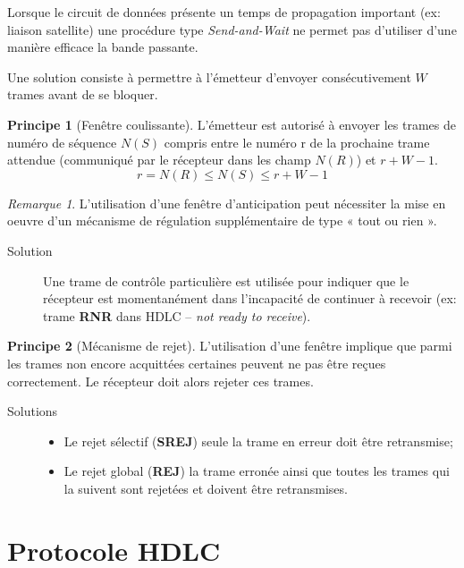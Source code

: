 \documentclass[11pt,english,french]{scrreprt}
\theoremstyle{remark}
\newtheorem*{rem*}{Remarque}
\theoremstyle{definition}
\newtheorem*{princ*}{Principe}
\begin{document}
Lorsque le circuit de données présente un temps de propagation important (ex: liaison satellite) une procédure type \emph{Send-and-Wait} ne permet pas d'utiliser d'une manière efficace la bande passante.

Une solution consiste à permettre à l'émetteur d'envoyer consécutivement $W$ trames avant de se bloquer.

\begin{princ*}[Fenêtre coulissante]
	 L'émetteur est autorisé à envoyer les trames de numéro de séquence $N(S)$ compris entre le numéro r de la prochaine trame attendue (communiqué par le récepteur dans les champ $N(R)$) et $r + W - 1$.
	\[
		r = N(R) \leqslant N(S) \leqslant r+W-1
	\]
\end{princ*}

\begin{rem*}
	L'utilisation d'une fenêtre d'anticipation peut nécessiter la mise en oeuvre d'un mécanisme de régulation supplémentaire de type « tout ou rien ».
\end{rem*}

\begin{description}
	\item[Solution] Une trame de contrôle particulière est utilisée pour indiquer que le récepteur est momentanément dans l'incapacité de continuer à recevoir (ex: trame \textbf{RNR} dans HDLC -- \emph{not ready to receive}).
\end{description}

\begin{princ*}[Mécanisme de rejet]
	L'utilisation d'une fenêtre implique que parmi les trames non encore acquittées certaines peuvent ne pas être reçues correctement. Le récepteur doit alors rejeter ces trames.
\end{princ*}

\begin{description}
	\item[Solutions] \hfill \begin{itemize}
		\item Le rejet sélectif (\textbf{SREJ}) seule la trame en erreur doit être retransmise;
		\item Le rejet global (\textbf{REJ}) la trame erronée ainsi que toutes les trames qui la suivent sont rejetées et doivent être retransmises.
	\end{itemize}
\end{description}

\section{Protocole HDLC} %
\end{document}
